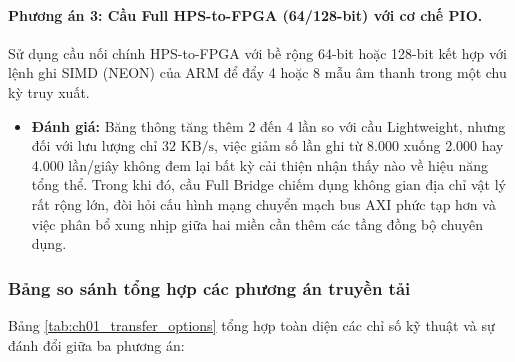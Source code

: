 \paragraph{Phương án 3: Cầu Full HPS-to-FPGA (64/128-bit) với cơ chế PIO.}
Sử dụng cầu nối chính HPS-to-FPGA với bề rộng 64-bit hoặc 128-bit kết hợp với lệnh ghi SIMD (NEON) của ARM để đẩy 4 hoặc 8 mẫu âm thanh trong một chu kỳ truy xuất.
\begin{itemize}[leftmargin=1.5em, itemsep=2pt]
    \item \textbf{Đánh giá:} Băng thông tăng thêm 2 đến 4 lần so với cầu Lightweight, nhưng đối với lưu lượng chỉ $32\text{ KB/s}$, việc giảm số lần ghi từ 8.000 xuống 2.000 hay 4.000 lần/giây không đem lại bất kỳ cải thiện nhận thấy nào về hiệu năng tổng thể. Trong khi đó, cầu Full Bridge chiếm dụng không gian địa chỉ vật lý rất rộng lớn, đòi hỏi cấu hình mạng chuyển mạch bus AXI phức tạp hơn và việc phân bổ xung nhịp giữa hai miền cần thêm các tầng đồng bộ chuyên dụng.
\end{itemize}

\subsubsection*{Bảng so sánh tổng hợp các phương án truyền tải}
Bảng \ref{tab:ch01_transfer_options} tổng hợp toàn diện các chỉ số kỹ thuật và sự đánh đổi giữa ba phương án:

